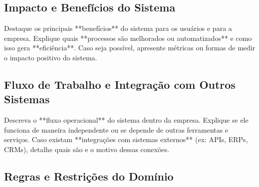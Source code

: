 \subsection{Impacto e Benefícios do Sistema}


Destaque os principais **benefícios** do sistema para os usuários e para a empresa.  
Explique quais **processos são melhorados ou automatizados** e como isso gera **eficiência**.  
Caso seja possível, apresente métricas ou formas de medir o impacto positivo do sistema.  

\subsection{Fluxo de Trabalho e Integração com Outros Sistemas}


Descreva o **fluxo operacional** do sistema dentro da empresa.  
Explique se ele funciona de maneira independente ou se depende de outras ferramentas e serviços.  
Caso existam **integrações com sistemas externos** (ex: APIs, ERPs, CRMs), detalhe quais são e o motivo dessas conexões.  

\subsection{Regras e Restrições do Domínio}


